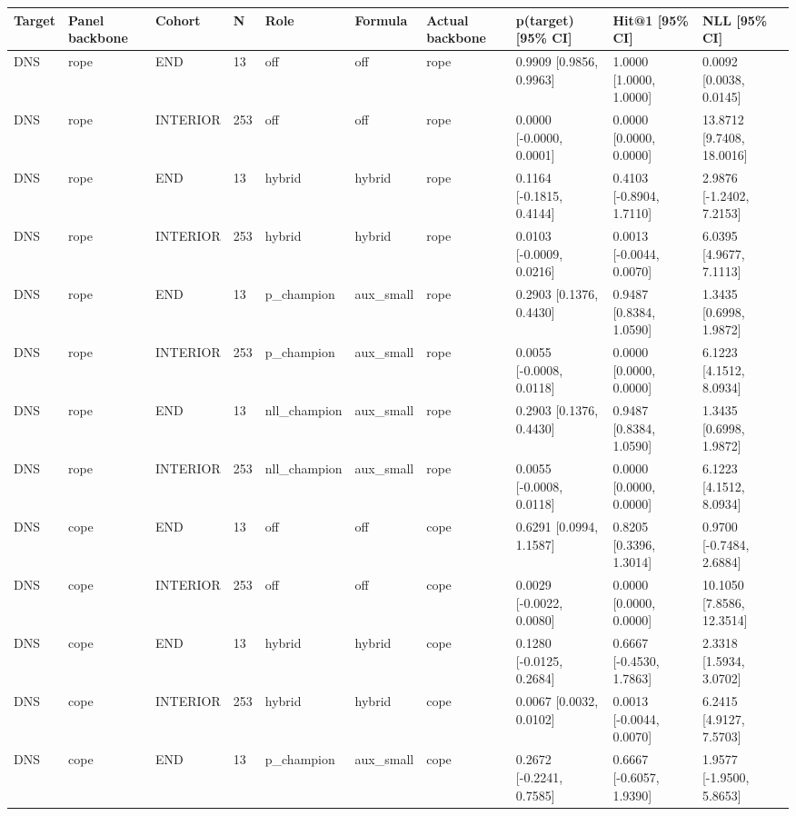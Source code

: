 \begin{tabular}{llllllllll}
\hline
Target & Panel backbone & Cohort & N & Role & Formula & Actual backbone & p(target) [95\% CI] & Hit@1 [95\% CI] & NLL [95\% CI] \\
\hline
DNS & rope & END & 13 & off & off & rope & 0.9909 [0.9856, 0.9963] & 1.0000 [1.0000, 1.0000] & 0.0092 [0.0038, 0.0145] \\
DNS & rope & INTERIOR & 253 & off & off & rope & 0.0000 [-0.0000, 0.0001] & 0.0000 [0.0000, 0.0000] & 13.8712 [9.7408, 18.0016] \\
DNS & rope & END & 13 & hybrid & hybrid & rope & 0.1164 [-0.1815, 0.4144] & 0.4103 [-0.8904, 1.7110] & 2.9876 [-1.2402, 7.2153] \\
DNS & rope & INTERIOR & 253 & hybrid & hybrid & rope & 0.0103 [-0.0009, 0.0216] & 0.0013 [-0.0044, 0.0070] & 6.0395 [4.9677, 7.1113] \\
DNS & rope & END & 13 & p\_champion & aux\_small & rope & 0.2903 [0.1376, 0.4430] & 0.9487 [0.8384, 1.0590] & 1.3435 [0.6998, 1.9872] \\
DNS & rope & INTERIOR & 253 & p\_champion & aux\_small & rope & 0.0055 [-0.0008, 0.0118] & 0.0000 [0.0000, 0.0000] & 6.1223 [4.1512, 8.0934] \\
DNS & rope & END & 13 & nll\_champion & aux\_small & rope & 0.2903 [0.1376, 0.4430] & 0.9487 [0.8384, 1.0590] & 1.3435 [0.6998, 1.9872] \\
DNS & rope & INTERIOR & 253 & nll\_champion & aux\_small & rope & 0.0055 [-0.0008, 0.0118] & 0.0000 [0.0000, 0.0000] & 6.1223 [4.1512, 8.0934] \\
DNS & cope & END & 13 & off & off & cope & 0.6291 [0.0994, 1.1587] & 0.8205 [0.3396, 1.3014] & 0.9700 [-0.7484, 2.6884] \\
DNS & cope & INTERIOR & 253 & off & off & cope & 0.0029 [-0.0022, 0.0080] & 0.0000 [0.0000, 0.0000] & 10.1050 [7.8586, 12.3514] \\
DNS & cope & END & 13 & hybrid & hybrid & cope & 0.1280 [-0.0125, 0.2684] & 0.6667 [-0.4530, 1.7863] & 2.3318 [1.5934, 3.0702] \\
DNS & cope & INTERIOR & 253 & hybrid & hybrid & cope & 0.0067 [0.0032, 0.0102] & 0.0013 [-0.0044, 0.0070] & 6.2415 [4.9127, 7.5703] \\
DNS & cope & END & 13 & p\_champion & aux\_small & cope & 0.2672 [-0.2241, 0.7585] & 0.6667 [-0.6057, 1.9390] & 1.9577 [-1.9500, 5.8653] \\

\end{tabular}
